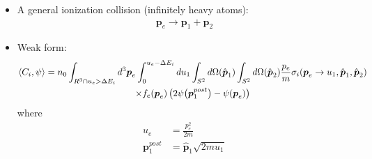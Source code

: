 \documentclass[mathserif, aspectratio=169]{beamer}
\newcommand{\vect}[1]{\boldsymbol{#1}}
\newcommand{\of}[1]{\mleft( #1 \mright)}
\begin{document}

\begin{frame}
\begin{itemize}
\item A general ionization collision (infinitely heavy atoms):
\begin{align*}
\vect{p}_e \rightarrow \vect{p}_1 + \vect{p}_2
\end{align*}
\item Weak form:
\begin{multline*}
\left< C_i, \psi \right> 
= 
n_0
\int_{R^3 \cap u_e > \Delta E_i} d^3 \vect{p}_e
\int_{0}^{u_{e} - \Delta E_i} d u_1 
\int_{S^2} d\Omega\of{\hat{\vect{p}}_1}
\int_{S^2} d\Omega\of{\hat{\vect{p}}_2}
\frac{ p_{e} }{ m }
\sigma_{i} \of{ \vect{p}_{e} \rightarrow u_{1}, \hat{\vect{p}}_{1}, \hat{\vect{p}}_{2}}
\\
\times
f_e\of{\vect{p}_e} \left( 2 \psi\of{\vect{p}_1^{post}}  
- \psi\of{\vect{p}_e} \right)
\end{multline*}
where
\begin{align*}
u_e &= \frac{p_e^2}{2m}
\\
\vect{p}_1^{post} &= \hat{\vect{p}}_1 \sqrt{2 m u_1}
\end{align*}
\end{itemize}

\end{frame}
\end{document}

